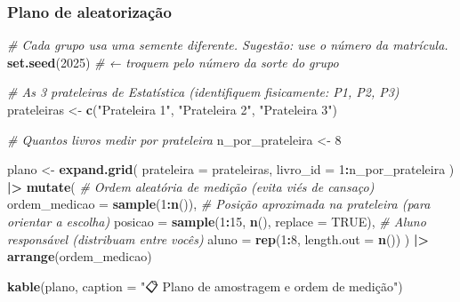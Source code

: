 \documentclass[
]{article}
\newenvironment{Shaded}{\begin{snugshade}}{\end{snugshade}}
\newcommand{\AttributeTok}[1]{\textcolor[rgb]{0.13,0.29,0.53}{#1}}
\newcommand{\CommentTok}[1]{\textcolor[rgb]{0.56,0.35,0.01}{\textit{#1}}}
\newcommand{\ConstantTok}[1]{\textcolor[rgb]{0.56,0.35,0.01}{#1}}
\newcommand{\DecValTok}[1]{\textcolor[rgb]{0.00,0.00,0.81}{#1}}
\newcommand{\FunctionTok}[1]{\textcolor[rgb]{0.13,0.29,0.53}{\textbf{#1}}}
\newcommand{\NormalTok}[1]{#1}
\newcommand{\OtherTok}[1]{\textcolor[rgb]{0.56,0.35,0.01}{#1}}
\newcommand{\SpecialCharTok}[1]{\textcolor[rgb]{0.81,0.36,0.00}{\textbf{#1}}}
\newcommand{\StringTok}[1]{\textcolor[rgb]{0.31,0.60,0.02}{#1}}
\begin{document}
\subsubsection{Plano de
aleatorização}\label{plano-de-aleatorizauxe7uxe3o}

\begin{Shaded}
\begin{Highlighting}[]
\CommentTok{\# Cada grupo usa uma semente diferente. Sugestão: use o número da matrícula.}
\FunctionTok{set.seed}\NormalTok{(}\DecValTok{2025}\NormalTok{)  }\CommentTok{\# ← troquem pelo número da sorte do grupo}

\CommentTok{\# As 3 prateleiras de Estatística (identifiquem fisicamente: P1, P2, P3)}
\NormalTok{prateleiras }\OtherTok{\textless{}{-}} \FunctionTok{c}\NormalTok{(}\StringTok{"Prateleira 1"}\NormalTok{, }\StringTok{"Prateleira 2"}\NormalTok{, }\StringTok{"Prateleira 3"}\NormalTok{)}

\CommentTok{\# Quantos livros medir por prateleira}
\NormalTok{n\_por\_prateleira }\OtherTok{\textless{}{-}} \DecValTok{8}

\NormalTok{plano }\OtherTok{\textless{}{-}} \FunctionTok{expand.grid}\NormalTok{(}
  \AttributeTok{prateleira =}\NormalTok{ prateleiras, }
  \AttributeTok{livro\_id =} \DecValTok{1}\SpecialCharTok{:}\NormalTok{n\_por\_prateleira}
\NormalTok{) }\SpecialCharTok{|\textgreater{}}
  \FunctionTok{mutate}\NormalTok{(}
    \CommentTok{\# Ordem aleatória de medição (evita viés de cansaço)}
    \AttributeTok{ordem\_medicao =} \FunctionTok{sample}\NormalTok{(}\DecValTok{1}\SpecialCharTok{:}\FunctionTok{n}\NormalTok{()),}
    \CommentTok{\# Posição aproximada na prateleira (para orientar a escolha)}
    \AttributeTok{posicao =} \FunctionTok{sample}\NormalTok{(}\DecValTok{1}\SpecialCharTok{:}\DecValTok{15}\NormalTok{, }\FunctionTok{n}\NormalTok{(), }\AttributeTok{replace =} \ConstantTok{TRUE}\NormalTok{),}
    \CommentTok{\# Aluno responsável (distribuam entre vocês)}
    \AttributeTok{aluno =} \FunctionTok{rep}\NormalTok{(}\DecValTok{1}\SpecialCharTok{:}\DecValTok{8}\NormalTok{, }\AttributeTok{length.out =} \FunctionTok{n}\NormalTok{())}
\NormalTok{  ) }\SpecialCharTok{|\textgreater{}}
  \FunctionTok{arrange}\NormalTok{(ordem\_medicao)}

\FunctionTok{kable}\NormalTok{(plano, }\AttributeTok{caption =} \StringTok{"📋 Plano de amostragem e ordem de medição"}\NormalTok{)}
\end{Highlighting}
\end{Shaded}
\end{document}

